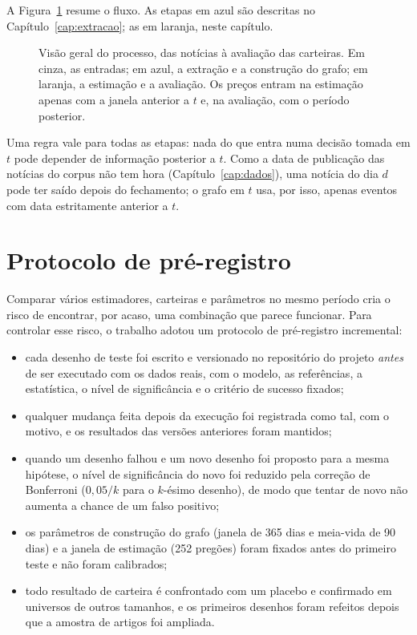A Figura~\ref{fig:pipeline} resume o fluxo. As etapas em azul são descritas no
Capítulo~\ref{cap:extracao}; as em laranja, neste capítulo.

\begin{figure}[htbp]
\centering

\caption{Visão geral do processo, das notícias à avaliação das carteiras. Em cinza, as entradas; em
azul, a extração e a construção do grafo; em laranja, a estimação e a avaliação. Os preços entram na
estimação apenas com a janela anterior a $t$ e, na avaliação, com o período posterior.}
\label{fig:pipeline}
\end{figure}

Uma regra vale para todas as etapas: nada do que entra numa decisão tomada em $t$ pode depender de
informação posterior a $t$. Como a data de publicação das notícias do corpus não tem hora
(Capítulo~\ref{cap:dados}), uma notícia do dia $d$ pode ter saído depois do fechamento; o grafo em $t$
usa, por isso, apenas eventos com data estritamente anterior a $t$.

\section{Protocolo de pré-registro}
\label{sec:preregistro}

Comparar vários estimadores, carteiras e parâmetros no mesmo período cria o risco de encontrar, por
acaso, uma combinação que parece funcionar. Para controlar esse risco, o trabalho adotou um protocolo de
pré-registro incremental:

\begin{itemize}
  \item cada desenho de teste foi escrito e versionado no repositório do projeto \emph{antes} de ser
        executado com os dados reais, com o modelo, as referências, a estatística, o nível de
        significância e o critério de sucesso fixados;
  \item qualquer mudança feita depois da execução foi registrada como tal, com o motivo, e os
        resultados das versões anteriores foram mantidos;
  \item quando um desenho falhou e um novo desenho foi proposto para a mesma hipótese, o nível de
        significância do novo foi reduzido pela correção de Bonferroni ($0{,}05/k$ para o $k$-ésimo
        desenho), de modo que tentar de novo não aumenta a chance de um falso positivo;
  \item os parâmetros de construção do grafo (janela de 365 dias e meia-vida de 90 dias) e a janela de
        estimação (252 pregões) foram fixados antes do primeiro teste e não foram calibrados;
  \item todo resultado de carteira é confrontado com um placebo e confirmado em universos de outros
        tamanhos, e os primeiros desenhos foram refeitos depois que a amostra de artigos foi ampliada.
\end{itemize}

